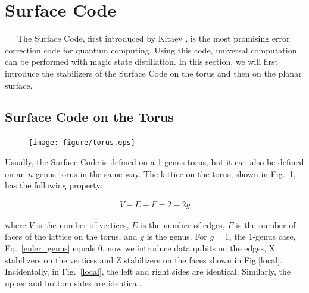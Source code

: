 \documentclass[a4paper,11pt]{ltjsarticle}
\begin{document}
\section{Surface Code}{
    \ \ \ The Surface Code, first introduced by Kitaev \cite{kitaev1997}, is the most promising error correction code for quantum computing. Using this code, universal computation can be performed with magic state distillation. In this section, we will first introduce the stabilizers of the Surface Code on the torus and then on the planar surface.

    \subsection{Surface Code on the Torus}{

        \begin{figure}[h]
            \centering
            \texttt{[image: figure/torus.eps]}
            \vspace{0pt}\caption{}
            \label{torus}
            \vspace{-15pt}
        \end{figure}

        Usually, the Surface Code is defined on a 1-genus torus, but it can also be defined on an $n$-genus torus in the same way. The lattice on the torus, shown in Fig.~\ref{torus}, has the following property:

        \begin{align}\label{euler_genus}
            V-E+F=2-2g
        \end{align}
        
        where $V$ is the number of vertices, $E$ is the number of edges, $F$ is the number of faces of the lattice on the torus, and $g$ is the genus. For $g = 1$, the 1-genus case, Eq.~\ref{euler_genus} equals $0$. now we introduce data qubits on the edges, X stabilizers on the vertices and Z stabilizers on the faces shown in Fig.\ref{local}. Incidentally, in Fig.~\ref{local}, the left and right sides are identical. Similarly, the upper and bottom sides are identical.
        \clearpage

}}
\end{document}

